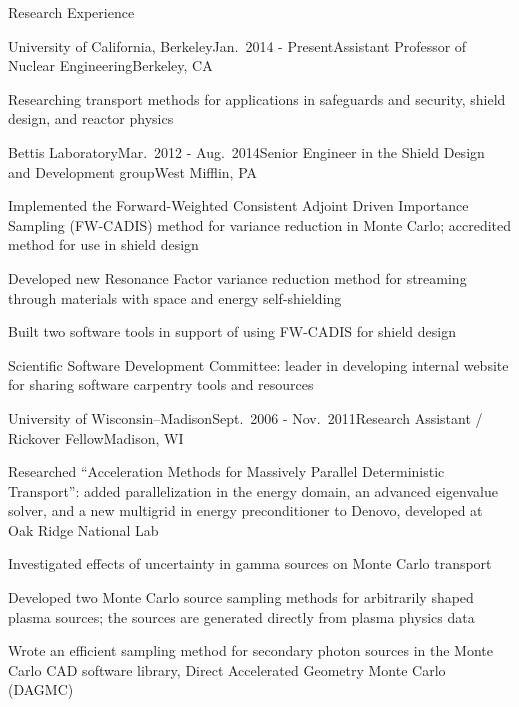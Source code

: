 \documentclass{resume2} %
\begin{document}
\begin{rSection}{Research Experience}

\begin{rSubsection}{University of California, Berkeley}{Jan.\ 2014 - Present}{Assistant Professor of Nuclear Engineering}{Berkeley, CA}
\item Researching transport methods for applications in safeguards and security, shield design, and reactor physics
\end{rSubsection}


\begin{rSubsection}{Bettis Laboratory}{Mar.\ 2012 - Aug.\ 2014}{Senior Engineer in the Shield Design and Development group}{West Mifflin, PA}
\item Implemented the Forward-Weighted Consistent Adjoint Driven Importance Sampling (FW-CADIS) method for variance reduction in Monte Carlo; accredited method for use in shield design
\item Developed new Resonance Factor variance reduction method for streaming through materials with space and energy self-shielding
\item Built two software tools in support of using FW-CADIS for shield design
\item Scientific Software Development Committee: leader in developing internal website for sharing software carpentry tools and resources
\end{rSubsection}


\begin{rSubsection}{University of Wisconsin--Madison}{Sept.\ 2006 - Nov.\ 2011}{Research Assistant / Rickover Fellow}{Madison, WI}
\item Researched “Acceleration Methods for Massively Parallel Deterministic Transport”: added parallelization in the energy domain, an advanced eigenvalue solver, and a new multigrid in energy preconditioner to Denovo, developed at Oak Ridge National Lab
\item Investigated effects of uncertainty in gamma sources on Monte Carlo transport
\item Developed two Monte Carlo source sampling methods for arbitrarily shaped plasma sources; the sources are generated directly from plasma physics data
\item Wrote an efficient sampling method for secondary photon sources in the Monte Carlo CAD software library, Direct Accelerated Geometry Monte Carlo (DAGMC)
\end{rSubsection}


\end{rSection}
\end{document}
